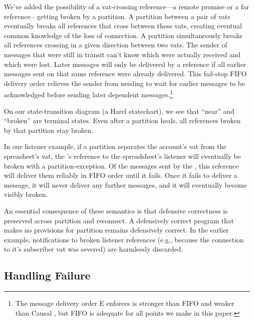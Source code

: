 \documentclass{llncs}
\begin{document}
We've added the possibility of a vat-crossing reference---a remote
promise or a far reference---getting broken by a partition. A
partition between a pair of vats eventually breaks all references that
cross between these vats, creating eventual common knowledge of the
loss of connection. A partition simultaneously breaks all references
crossing in a given direction between two vats. The sender of messages
that were still in transit can't know which were actually received and
which were lost. Later messages will only be delivered by a reference
if all earlier messages sent on that same reference were already
delivered. This fail-stop FIFO delivery order relieves the sender from
needing to wait for earlier messages to be acknowledged before sending
later dependent messages.\footnote{
%
The message delivery order E enforces is stronger than FIFO and weaker
than Causal \cite{tribble:channels}, but FIFO is adequate for all
points we make in this paper.}

On our state-transition diagram (a Harel statechart), we see that
``near'' and ``broken'' are terminal states. Even after a partition
heals, all references broken by that partition stay broken.

In our listener example, if a partition separates the account's vat
from the spreasheet's vat, the 's reference to the
spreadsheet's listener will eventually be broken with a
partition-exception. Of the  messages sent by the
, this reference will deliver them reliably in FIFO
order until it fails. Once it fails to deliver a message, it will
never deliver any further messages, and it will eventually become
visibly broken.

An essential consequence of these semantics is that defensive
correctness is preserved across partition and reconnect.  A
defensively correct program that makes no provisions for partition
remains defensively correct. In the earlier 
example,  notifications to broken listener
references (e.g., because the connection to it's subscriber vat was
severed) are harmlessly discarded.

\subsection{Handling Failure}
\end{document}
